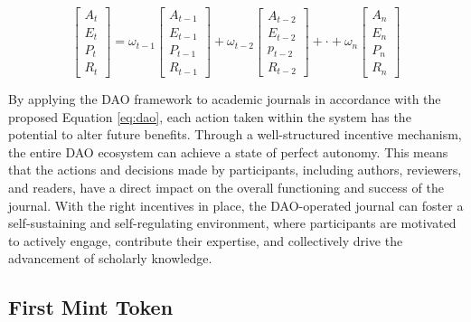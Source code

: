 \documentclass[lettersize,journal]{IEEEtran}
\begin{document}
\begin{equation}
  \begin{bmatrix}
    A_t \\
    E_t \\
    P_t \\
    R_t 
  \end{bmatrix}
  = 
  \omega_{t-1}
  \begin{bmatrix}
    A_{t-1} \\
    E_{t-1} \\
    P_{t-1} \\
    R_{t-1}
  \end{bmatrix}
  +
  \omega_{t-2}
  \begin{bmatrix}
    A_{t-2} \\
    E_{t-2} \\
    p_{t-2} \\
    R_{t-2}
  \end{bmatrix}
  +
  \cdot
  + 
  \omega_n
  \begin{bmatrix}
    A_n \\
    E_n \\
    P_n \\
    R_n
  \end{bmatrix}
  \label{eq:dao}
\end{equation}



By applying the DAO framework to academic journals in accordance with the proposed Equation \ref{eq:dao}, each action taken within the system has the potential to alter future benefits. Through a well-structured incentive mechanism, the entire DAO ecosystem can achieve a state of perfect autonomy. This means that the actions and decisions made by participants, including authors, reviewers, and readers, have a direct impact on the overall functioning and success of the journal. With the right incentives in place, the DAO-operated journal can foster a self-sustaining and self-regulating environment, where participants are motivated to actively engage, contribute their expertise, and collectively drive the advancement of scholarly knowledge.


\subsection{First Mint Token}
\end{document}

